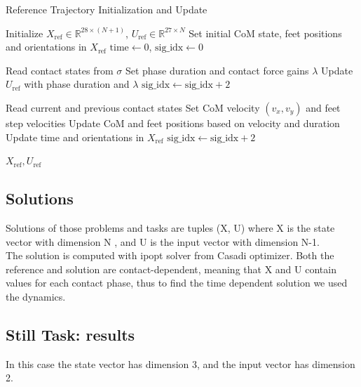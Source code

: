\documentclass[main.tex]{subfiles}
\begin{document}
\begin{algorithm}
\caption{Reference Trajectory Initialization and Update}
\begin{algorithmic}[1]
\State Initialize $X_{\text{ref}} \in \mathbb{R}^{28 \times (N+1)}$, $U_{\text{ref}} \in \mathbb{R}^{27 \times N}$
\State Set initial CoM state, feet positions and orientations in $X_{\text{ref}}$
\State $\text{time} \gets 0$, $\text{sig\_idx} \gets 0$

    \State Read contact states from $\sigma$
    \State Set phase duration and contact force gains $\lambda$
    \State Update $U_{\text{ref}}$ with phase duration and $\lambda$
    \State $\text{sig\_idx} \gets \text{sig\_idx} + 2$
\EndFor

    \State Read current and previous contact states
    \State Set CoM velocity $(v_x, v_y)$ and feet step velocities
    \State Update CoM and feet positions based on velocity and duration
    \State Update time and orientations in $X_{\text{ref}}$
    \State $\text{sig\_idx} \gets \text{sig\_idx} + 2$
\EndFor

\State \Return $X_{\text{ref}}, U_{\text{ref}}$
\end{algorithmic}
\end{algorithm}


\subsection{Solutions}
Solutions of those problems and tasks are tuples (X, U) where X is the state vector with dimension N , and U is the input vector with dimension N-1.
\\The solution is computed with ipopt solver from Casadi optimizer. Both the reference and solution are contact-dependent, meaning that X and U contain values for each contact phase, thus to find the time dependent solution we used the dynamics. 

\subsection{Still Task: results}
In this case the state vector has dimension 3, and the input vector has dimension 2.
\end{document}
